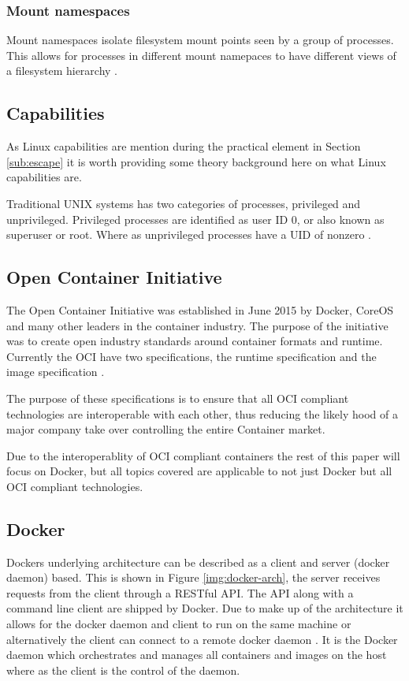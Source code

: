 \subsubsection{Mount namespaces}
Mount namespaces isolate filesystem mount points seen by a group of processes. This allows for processes in different mount namepaces to have different views of a filesystem hierarchy \citep{kerrisk_2013}.

\subsection{Capabilities}
\label{sub:capabilities}
As Linux capabilities are mention during the practical element in Section \ref{sub:escape} it is worth providing some theory background here on what Linux capabilities are.

Traditional UNIX systems has two categories of processes, privileged and unprivileged. Privileged processes are identified as user ID 0, or also known as superuser or root. Where as unprivileged processes have a UID of nonzero \citep{linux-manual}.

\subsection{Open Container Initiative}
The Open Container Initiative was established in June 2015 by Docker, CoreOS and many other leaders in the container industry. The purpose of the initiative was to create open industry standards around container formats and runtime. Currently the OCI have two specifications, the runtime specification and the image specification \citep{oci}. 

The purpose of these specifications is to ensure that all OCI compliant technologies are interoperable with each other, thus reducing the likely hood of a major company take over controlling the entire Container market.

Due to the interoperablity of OCI compliant containers the rest of this paper will focus on Docker, but all topics covered are applicable to not just Docker but all OCI compliant technologies.

\subsection{Docker}
\label{sub:dock}
Dockers underlying architecture can be described as a client and server (docker daemon) based. This is shown in Figure \ref{img:docker-arch}, the server receives requests from the client through a RESTful API. The API along with a command line client are shipped by Docker. Due to make up of the architecture it allows for the docker daemon and client to run on the same machine or alternatively the client can connect to a remote docker daemon \citep{rad_bhatti_ahmadi_18}. It is the Docker daemon which orchestrates and manages all containers and images on the host where as the client is the control of the daemon.

